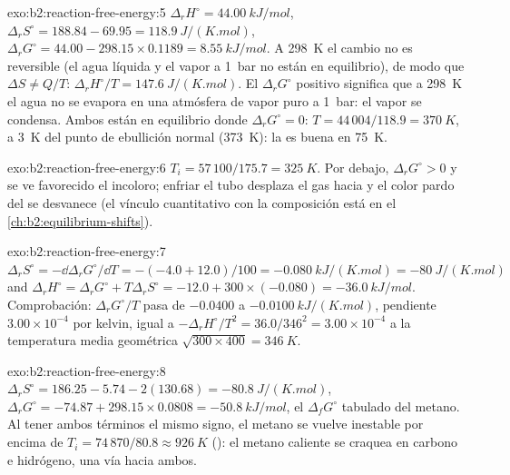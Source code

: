 \begin{solution}{exo:b2:reaction-free-energy:5}
$\Delta_r H^\circ = \qty{44.00}{kJ/mol}$, $\Delta_r S^\circ = 188.84 - 69.95 =
\qty{118.9}{J/(K.mol)}$, $\Delta_r G^\circ = 44.00 - 298.15 \times 0.1189 =
\qty{+8.55}{kJ/mol}$. A \qty{298}{K} el cambio no es reversible (el agua líquida
y el vapor a \qty{1}{bar} no están en equilibrio), de modo que $\Delta S \ne
Q/T$: $\Delta_r H^\circ/T = \qty{147.6}{J/(K.mol)}$. El $\Delta_r G^\circ$
positivo significa que a \qty{298}{K} el agua no se evapora en
una atmósfera de vapor puro a \qty{1}{bar}: el vapor se condensa. Ambos
están en equilibrio donde $\Delta_r G^\circ = 0$: $T = 44\,004/118.9 =
\qty{370}{K}$, a \qty{3}{K} del punto de ebullición normal
(\qty{373}{K}): la  es buena en \qty{75}{K}.
\end{solution}

\begin{solution}{exo:b2:reaction-free-energy:6}
$T_i = 57\,100/175.7 = \qty{325}{K}$. Por debajo, $\Delta_r G^\circ > 0$ y
se ve favorecido el  incoloro; enfriar el tubo desplaza el gas hacia
 y el color pardo del  se desvanece (el vínculo cuantitativo con
la composición está en el \cref{ch:b2:equilibrium-shifts}).
\end{solution}

\begin{solution}{exo:b2:reaction-free-energy:7}
$\Delta_r S^\circ = -\dd\Delta_r G^\circ/\dd T = -(-4.0 + 12.0)/100 =
\qty{-0.080}{kJ/(K.mol)} = \qty{-80}{J/(K.mol)}$ and $\Delta_r H^\circ =
\Delta_r G^\circ + T\Delta_r S^\circ = -12.0 + 300 \times (-0.080) =
\qty{-36.0}{kJ/mol}$. Comprobación: $\Delta_r G^\circ/T$ pasa de $-0.0400$ a
$\qty{-0.0100}{kJ/(K.mol)}$, pendiente $3.00 \times 10^{-4}$ por kelvin, igual a
$-\Delta_r H^\circ/T^2 = 36.0/346^2 = 3.00 \times 10^{-4}$ a la temperatura
media geométrica $\sqrt{300 \times 400} = \qty{346}{K}$.
\end{solution}

\begin{solution}{exo:b2:reaction-free-energy:8}
$\Delta_r S^\circ = 186.25 - 5.74 - 2(130.68) = \qty{-80.8}{J/(K.mol)}$,
$\Delta_r G^\circ = -74.87 + 298.15 \times 0.0808 = \qty{-50.8}{kJ/mol}$,
el $\Delta_f G^\circ$ tabulado del metano. Al tener ambos términos el mismo
signo, el metano se vuelve inestable por encima de $T_i = 74\,870/80.8 \approx
\qty{926}{K}$ (): el metano caliente se craquea en carbono e
hidrógeno, una vía hacia ambos.
\end{solution}

